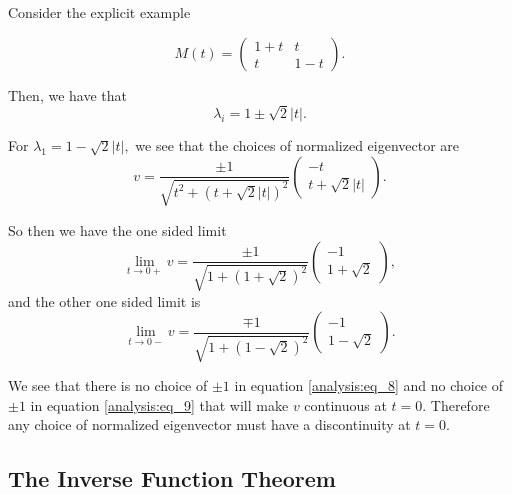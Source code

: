 \begin{example}
Consider the explicit example

\begin{equation}
M(t) = \begin{pmatrix}
1 + t & t\\
t & 1-t
\end{pmatrix}.
\end{equation}

Then, we have that
\begin{equation}
\lambda_i = 1 \pm \sqrt{2}|t|.
\end{equation}

For $\lambda_1 = 1-\sqrt{2}|t|,$ we see that the choices of normalized eigenvector are
\begin{equation}
v = \frac{\pm 1}{\sqrt{t^2 + (t+\sqrt{2}|t|)^2}}\begin{pmatrix} -t \\ t+\sqrt{2}|t|  \end{pmatrix}.
\end{equation}

So then we have the one sided limit
\begin{equation}\label{analysis:eq_8}
\lim\limits_{t\to 0+} v = \frac{\pm 1}{\sqrt{1+(1+\sqrt{2})^2}}\begin{pmatrix}-1 \\ 1 + \sqrt{2} \end{pmatrix},
\end{equation}
and the other one sided limit is
\begin{equation}\label{analysis:eq_9}
\lim\limits_{t\to 0-} v = \frac{\mp 1}{\sqrt{1+(1-\sqrt{2})^2}}\begin{pmatrix}-1 \\ 1 - \sqrt{2} \end{pmatrix}.
\end{equation}

We see that there is no choice of $\pm 1$ in equation \eqref{analysis:eq_8} and no choice of $\pm 1$ in equation \eqref{analysis:eq_9} that will make $v$ continuous at $t=0$. Therefore any choice of normalized eigenvector must have a discontinuity at $t=0$.
\end{example}


\subsection{The Inverse Function Theorem}

